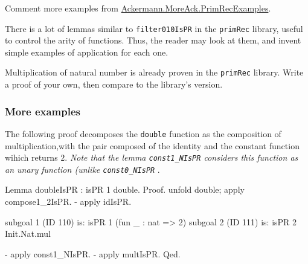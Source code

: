 \begin{todo}
Comment more examples from   \href{../theories/html/hydras.Ackermann.MoreAck.PrimRecExamples.html}{Ackermann.MoreAck.PrimRecExamples}.
\end{todo}

\begin{exercise}
There is a lot of lemmas similar to \texttt{filter010IsPR} in the \texttt{primRec} library, useful to control the arity of functions.
Thus, the reader may look at them, and invent simple examples of application for each one.
\end{exercise}

\begin{exercise}
Multiplication of natural number is already proven in the \texttt{primRec} library. Write a proof of your own, then compare to the library's version.
\end{exercise}

\subsubsection{More examples}

The following proof decomposes the \texttt{double} function as the composition of 
multiplication,with the pair composed of the identity and the constant function wihich returns $2$.
\emph{Note that the lemma \texttt{const1\_NIsPR} considers this function as an unary function (unlike \texttt{const0\_NIsPR} }. 

\begin{Coqsrc}
Lemma doubleIsPR : isPR 1 double.
Proof.
  unfold double; apply compose1_2IsPR.
  - apply idIsPR.
\end{Coqsrc}

\begin{Coqanswer}
subgoal 1 (ID 110) is:
 isPR 1 (fun _ : nat => 2)
subgoal 2 (ID 111) is:
 isPR 2 Init.Nat.mul
\end{Coqanswer}

 \begin{Coqsrc}
  - apply const1_NIsPR.
  - apply multIsPR.
Qed.
\end{Coqsrc}

